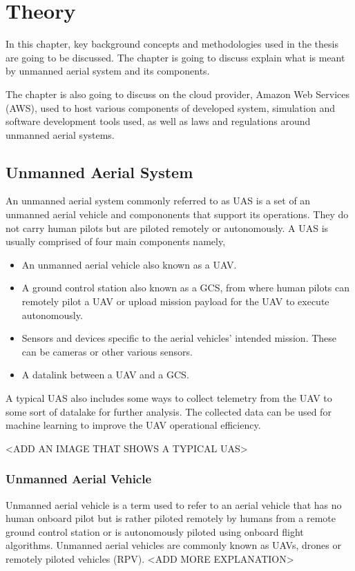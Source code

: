 
\chapter{Theory}

In this chapter, key background concepts and methodologies used in the thesis are going to be discussed. The chapter is going to discuss explain what is meant by unmanned aerial system and its components.

The chapter is also going to discuss on the cloud provider, Amazon Web Services (AWS), used to host various components of developed system, simulation and software development tools used, as well as laws and regulations around unmanned aerial systems.

\section{Unmanned Aerial System}
\label{sec:unmanned-aerial-system}

An unmanned aerial system commonly referred to as UAS is a set of an unmanned aerial vehicle and compononents that support its operations. They do not carry human pilots but are piloted remotely or autonomously. A UAS is usually comprised of four main components namely,

\begin{itemize}
    \item An unmanned aerial vehicle also known as a UAV.
    \item A ground control station also known as a GCS, from where human pilots can remotely pilot a UAV or upload mission payload for the UAV to execute autonomously.
    \item Sensors and devices specific to the aerial vehicles' intended mission. These can be cameras or other various sensors.
    \item A datalink between a UAV and a GCS.
\end{itemize}

A typical UAS also includes some ways to collect telemetry from the UAV to some sort of datalake for further analysis. The collected data can be used for machine learning to improve the UAV operational efficiency.

<ADD AN IMAGE THAT SHOWS A TYPICAL UAS>

\subsection{Unmanned Aerial Vehicle}
Unmanned aerial vehicle is a term used to refer to an aerial vehicle that has no human onboard pilot but is rather piloted remotely by humans from a remote ground control station or is autonomously piloted using onboard flight algorithms. Unmanned aerial vehicles are commonly known as UAVs, drones or remotely piloted vehicles (RPV).
<ADD MORE EXPLANATION>

